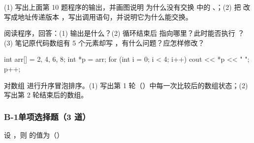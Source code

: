 (1) 写出上面第 10 题程序的输出，并画图说明  为什么没有交换  中的 、；(2) 把  改写成地址传递版本 ，写出调用语句，并说明它为什么能交换。

阅读程序，回答：(1) 输出是什么？(2) 循环结束后  指向哪里？此时能否执行 ？(3) 笔记原代码数组有 5 个元素却写 ，有什么问题？应怎样修改？
\begin{code}
int arr[] = {2, 4, 6, 8};
int *p = arr;
for (int i = 0; i < 4; i++) { cout << *p << " "; p++; }
\end{code}
\begin{center}\end{center}

对数组  进行升序冒泡排序。(1) 写出第 1 轮（）中每一次比较后的数组状态；(2) 写出第 2 轮结束后的数组。
\begin{center}\end{center}

\subsubsection*{B-1\quad 单项选择题（3 道）}

设 ，则  的值为（\quad{}）
\begin{center}\end{center}

